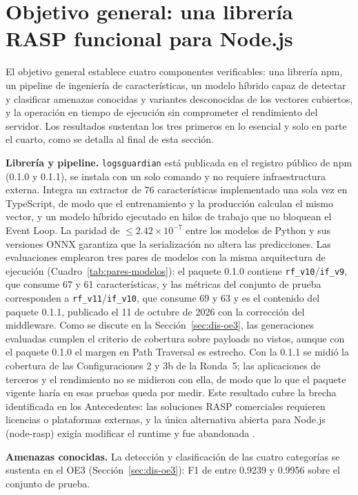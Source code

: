 \section{Objetivo general: una librería RASP funcional para Node.js}

El objetivo general establece cuatro componentes verificables: una librería npm, un pipeline de
ingeniería de características, un modelo híbrido capaz de detectar y clasificar amenazas conocidas
y variantes desconocidas de los vectores cubiertos, y la operación en tiempo de ejecución sin
comprometer el rendimiento del servidor. Los resultados sustentan los tres primeros en lo esencial
y solo en parte el cuarto, como se detalla al final de esta sección.

\textbf{Librería y pipeline.} \texttt{logsguardian} está publicada en el registro público de
npm (0.1.0 y 0.1.1), se instala con un solo comando y no requiere infraestructura externa. Integra un extractor de
76 características implementado una sola vez en TypeScript, de modo que el entrenamiento y la
producción calculan el mismo vector, y un modelo híbrido ejecutado en hilos de trabajo que no
bloquean el Event Loop. La paridad de $\leq2.42\times10^{-7}$ entre los modelos de Python y sus
versiones ONNX garantiza que la serialización no altera las predicciones. Las evaluaciones
emplearon tres pares de modelos con la misma arquitectura de ejecución
(Cuadro~\ref{tab:pares-modelos}): el paquete 0.1.0 contiene \texttt{rf\_v10}/\texttt{if\_v9}, que
consume 67 y 61 características, y las métricas del conjunto de prueba corresponden a
\texttt{rf\_v11}/\texttt{if\_v10}, que consume 69 y 63 y es el contenido del paquete 0.1.1,
publicado el 11 de octubre de 2026 con la corrección del middleware. Como se discute en la
Sección~\ref{sec:dis-oe3}, las generaciones evaluadas cumplen el criterio de cobertura sobre
payloads no vistos, aunque con el paquete 0.1.0 el margen en Path Traversal es estrecho. Con la 0.1.1 se midió la cobertura de las Configuraciones 2 y 3b de la Ronda~5; las aplicaciones de
terceros y el rendimiento no se midieron con ella, de modo que lo que el paquete vigente haría en
esas pruebas queda por medir. Este resultado cubre la brecha identificada en los Antecedentes: las soluciones
RASP comerciales requieren licencias o plataformas externas, y la única alternativa abierta para
Node.js (node-rasp) exigía modificar el runtime y fue abandonada \cite{saparchive2019}.

\textbf{Amenazas conocidas.} La detección y clasificación de las cuatro categorías se sustenta en
el OE3 (Sección~\ref{sec:dis-oe3}): F1 de entre 0.9239 y 0.9956 sobre el conjunto de prueba.

